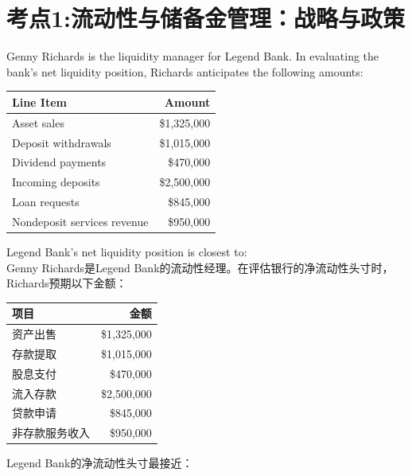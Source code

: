 \documentclass{article}
\newcounter{question} %
\begin{document}
 \tableofcontents %
\newpage




\section{考点1:流动性与储备金管理：战略与政策}
\setcounter{question}{0}

\begin{question}
    Genny Richards is the liquidity manager for Legend Bank. In evaluating the bank's net liquidity position, Richards anticipates the following amounts:

    \begin{table}[htbp]
        \centering
        \begin{tabular}{|l|r|}
            \hline
            \textbf{Line Item} & \textbf{Amount} \\
            \hline
            Asset sales & \$1,325,000 \\
            Deposit withdrawals & \$1,015,000 \\
            Dividend payments & \$470,000 \\
            Incoming deposits & \$2,500,000 \\
            Loan requests & \$845,000 \\
            Nondeposit services revenue & \$950,000 \\
            \hline
        \end{tabular}
    \end{table}
    Legend Bank's net liquidity position is closest to:
    \\  Genny Richards是Legend Bank的流动性经理。在评估银行的净流动性头寸时，Richards预期以下金额：

    \begin{table}[htbp]
        \centering
        \begin{tabular}{|l|r|}
            \hline
            \textbf{项目} & \textbf{金额} \\
            \hline
            资产出售 & \$1,325,000 \\
            存款提取 & \$1,015,000 \\
            股息支付 & \$470,000 \\
            流入存款 & \$2,500,000 \\
            贷款申请 & \$845,000 \\
            非存款服务收入 & \$950,000 \\
            \hline
        \end{tabular}
    \end{table}
    Legend Bank的净流动性头寸最接近：
\end{question}
\end{document}
